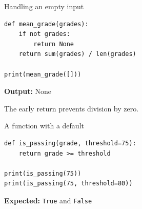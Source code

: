 \documentclass[aspectratio=169,12pt]{beamer}
\begin{document}
\begin{frame}[fragile]{Handling an empty input}
\begin{lstlisting}
def mean_grade(grades):
    if not grades:
        return None
    return sum(grades) / len(grades)

print(mean_grade([]))
\end{lstlisting}
\textbf{Output:} None
\par The early return prevents division by zero.

\end{frame}
\begin{frame}[fragile]{A function with a default}
\begin{lstlisting}
def is_passing(grade, threshold=75):
    return grade >= threshold

print(is_passing(75))
print(is_passing(75, threshold=80))
\end{lstlisting}
\textbf{Expected:} \texttt{True} and \texttt{False}

\end{frame}
\end{document}
